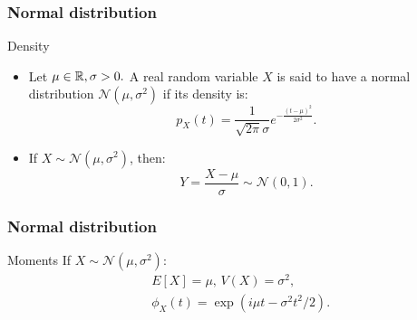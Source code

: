 \begin{frame}
    \frametitle{Normal distribution}
\begin{block}{Density}
    \begin{itemize}
        \item<+-> Let $\mu \in \mathbb{R}, \sigma > 0.$ A real random variable $X$
        is said to have a normal distribution $\mathcal{N}(\mu,\sigma^2)$ if its
        density is:
        \begin{equation}
            p_X(t)=\frac{1}{\sqrt{2 \pi}\sigma}e^{-\frac{(t-\mu)^2}{2 \sigma^2}}.
        \end{equation}
        \item<+-> If $X \sim \mathcal{N}(\mu,\sigma^2)$, then:
        \begin{equation}
            Y = \frac{X-\mu}{\sigma} \sim \mathcal{N}(0,1).
        \end{equation}
    \end{itemize}
\end{block}
\end{frame}
\begin{frame}
    \frametitle{Normal distribution}
\begin{block}{Moments}
    If $X\sim \mathcal{N}\left(\mu, \sigma^2\right):$
    \begin{equation}
        \begin{split}
            &E\left[ X \right] = \mu, \, V\left( X \right) = \sigma^2,\\
            & \phi_X(t)= \exp\left( i \mu t - \sigma^2 t^2 / 2 \right).
        \end{split}
    \end{equation}
\end{block}
    

\end{frame}